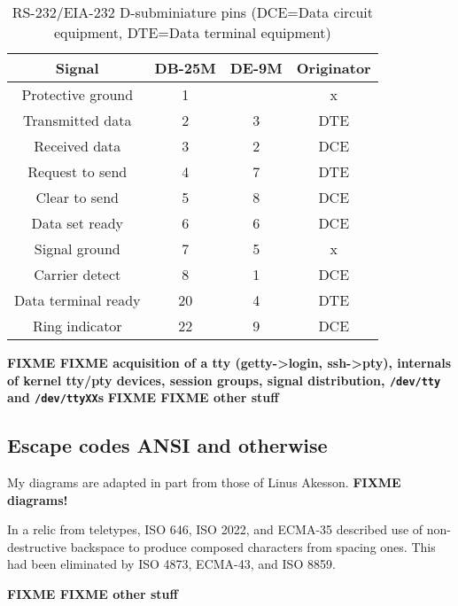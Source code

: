 \begin{table}
  \centering
  \begin{tabular}{ |c|c|c|c| }
    \hline
    Signal & DB-25M & DE-9M & Originator \\
    \hline
    \hline
    Protective ground & 1 & & x \\
    \hline
    Transmitted data & 2 & 3 & DTE \\
    \hline
    Received data & 3 & 2 & DCE \\
    \hline
    Request to send & 4 & 7 & DTE \\
    \hline
    Clear to send & 5 & 8 & DCE \\
    \hline
    Data set ready & 6 & 6 & DCE \\
    \hline
    Signal ground & 7 & 5 & x \\
    \hline
    Carrier detect & 8 & 1 & DCE \\
    \hline
    Data terminal ready & 20 & 4 & DTE \\
    \hline
    Ring indicator & 22 & 9 & DCE \\
    \hline
  \end{tabular}
  \caption[RS-232/EIA-232 pin mappings]{RS-232/EIA-232 D-subminiature pins (DCE=Data circuit equipment, DTE=Data terminal equipment)}
  \label{table:serial}
\end{table}

\textbf{FIXME FIXME acquisition of a tty (getty->login, ssh->pty),
  internals of kernel tty/pty devices, session groups, signal distribution,
  \texttt{/dev/tty} and \texttt{/dev/ttyXX}s}
\textbf{FIXME FIXME other stuff}
\subsection{Escape codes ANSI and otherwise}
\label{sec:escapes}
My diagrams are adapted in part from those of Linus Akesson\cite{ttydemystified}.
\textbf{FIXME diagrams!}

In a relic from teletypes, ISO 646, ISO 2022, and ECMA-35 described use of
non-destructive backspace to produce composed characters from spacing ones.
This had been eliminated by ISO 4873, ECMA-43, and ISO 8859.

\textbf{FIXME FIXME other stuff}
